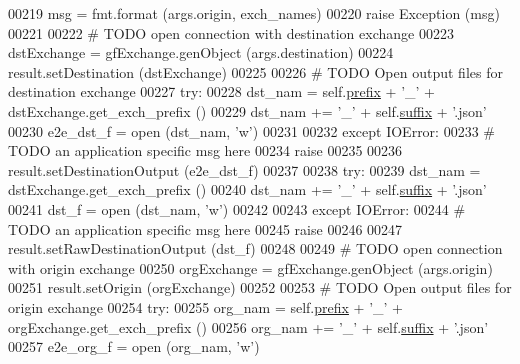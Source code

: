 \begin{DoxyCode}
{00219             msg = fmt.format (args.origin, exch\_names)
00220             \textcolor{keywordflow}{raise} Exception (msg)
00221         
00222         \textcolor{comment}{# TODO open connection with destination exchange}
00223         dstExchange = gfExchange.genObject (args.destination)
00224         result.setDestination (dstExchange)
00225             
00226         \textcolor{comment}{# TODO Open output files for destination exchange}
00227         \textcolor{keywordflow}{try}:
00228             dst\_nam  =  self.\hyperlink{classe2e_1_1_application_a027ff25e5409ae17584978a09fc2611a}{prefix} + \textcolor{stringliteral}{'\_'} + dstExchange.get\_exch\_prefix ()
00229             dst\_nam += \textcolor{stringliteral}{'\_'} + self.\hyperlink{classe2e_1_1_application_a4d824ad36b051d2d629edb314385df0d}{suffix} + \textcolor{stringliteral}{'.json'}
00230             e2e\_dst\_f = open (dst\_nam, \textcolor{stringliteral}{'w'})
00231             
00232         \textcolor{keywordflow}{except} IOError:
00233             \textcolor{comment}{# TODO an application specific msg here}
00234             \textcolor{keywordflow}{raise}
00235             
00236         result.setDestinationOutput (e2e\_dst\_f)
00237             
00238         \textcolor{keywordflow}{try}:
00239             dst\_nam  = dstExchange.get\_exch\_prefix ()
00240             dst\_nam += \textcolor{stringliteral}{'\_'} + self.\hyperlink{classe2e_1_1_application_a4d824ad36b051d2d629edb314385df0d}{suffix} + \textcolor{stringliteral}{'.json'}
00241             dst\_f = open (dst\_nam, \textcolor{stringliteral}{'w'})
00242             
00243         \textcolor{keywordflow}{except} IOError:
00244             \textcolor{comment}{# TODO an application specific msg here}
00245             \textcolor{keywordflow}{raise}
00246             
00247         result.setRawDestinationOutput (dst\_f)
00248             
00249         \textcolor{comment}{# TODO open connection with origin exchange}
00250         orgExchange = gfExchange.genObject (args.origin)
00251         result.setOrigin (orgExchange)
00252             
00253         \textcolor{comment}{# TODO Open output files for origin exchange}
00254         \textcolor{keywordflow}{try}:
00255             org\_nam  =  self.\hyperlink{classe2e_1_1_application_a027ff25e5409ae17584978a09fc2611a}{prefix} + \textcolor{stringliteral}{'\_'} + orgExchange.get\_exch\_prefix ()
00256             org\_nam += \textcolor{stringliteral}{'\_'} + self.\hyperlink{classe2e_1_1_application_a4d824ad36b051d2d629edb314385df0d}{suffix} + \textcolor{stringliteral}{'.json'}
00257             e2e\_org\_f = open (org\_nam, \textcolor{stringliteral}{'w'})
}
\end{DoxyCode}
